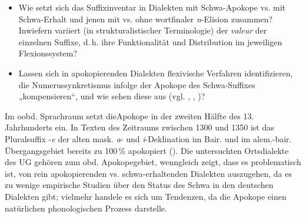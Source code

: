 \begin{itemize}
\item Wie setzt sich das Suffixinventar in Dialekten mit Schwa-Apokope vs. mit Schwa-Erhalt und jenen mit vs. ohne wortfinaler \textit{n}{}-Elision zusammen? Inwiefern variiert (in strukturalistischer Terminologie) der \textit{valeur} der einzelnen Suffixe, d.\,h. ihre Funktionalität und Distribution im jeweiligen Flexionssystem?
\item Lassen sich in apokopierenden Dialekten flexivische Verfahren identifizieren, die Numerussynkretismus infolge der Apokope des Schwa-Suffixes „kompensieren“, und wie sehen diese aus (vgl. \citealt[1197--1198]{Dingeldein1983}, \citealt[135]{Girnth2006}, \citealt[163--164]{Schirmunski1962})?
\end{itemize}

Im oobd. Sprachraum setzt dieApokope in der zweiten Hälfte des 13. Jahrhunderts ein. In Texten des Zeitraums zwischen 1300 und 1350 ist das Pluralsuffix -\textit{e} der alten mask. \textit{a}{}- und \textit{i}{}-Deklination im Bair. und im alem.-bair. Übergangsgebiet bereits zu 100\,\% apokopiert (\citealt[136]{KleinEtAl2018}). Die untersuchten Ortsdialekte des UG gehören zum obd. Apokopegebiet, wenngleich \citet[51 und 203]{Birkenes2014} zeigt, dass es problematisch ist, von rein apokopierenden vs. schwa-erhaltenden Dialekten auszugehen, da es zu wenige empirische Studien über den Status des Schwa in den deutschen Dialekten gibt; vielmehr handele es sich um Tendenzen, da die Apokope einen natürlichen phonologischen Prozess darstelle.

